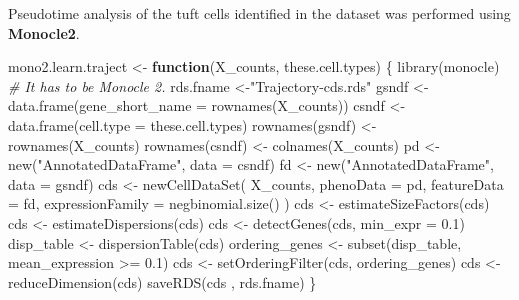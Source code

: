 \documentclass[
  openany]{book}
\newenvironment{Shaded}{\begin{snugshade}}{\end{snugshade}}
\newcommand{\AttributeTok}[1]{\textcolor[rgb]{0.77,0.63,0.00}{#1}}
\newcommand{\CommentTok}[1]{\textcolor[rgb]{0.56,0.35,0.01}{\textit{#1}}}
\newcommand{\ControlFlowTok}[1]{\textcolor[rgb]{0.13,0.29,0.53}{\textbf{#1}}}
\newcommand{\FloatTok}[1]{\textcolor[rgb]{0.00,0.00,0.81}{#1}}
\newcommand{\FunctionTok}[1]{\textcolor[rgb]{0.00,0.00,0.00}{#1}}
\newcommand{\NormalTok}[1]{#1}
\newcommand{\OtherTok}[1]{\textcolor[rgb]{0.56,0.35,0.01}{#1}}
\newcommand{\SpecialCharTok}[1]{\textcolor[rgb]{0.00,0.00,0.00}{#1}}
\newcommand{\StringTok}[1]{\textcolor[rgb]{0.31,0.60,0.02}{#1}}
\begin{document}
Pseudotime analysis of the tuft cells identified in the dataset was performed using \textbf{Monocle2}.

\begin{Shaded}
\begin{Highlighting}[]
\NormalTok{mono2.learn.traject }\OtherTok{\textless{}{-}}
  \ControlFlowTok{function}\NormalTok{(X\_counts,}
\NormalTok{           these.cell.types) \{}
    \FunctionTok{library}\NormalTok{(monocle) }\CommentTok{\# It has to be Monocle 2.}
\NormalTok{    rds.fname }\OtherTok{\textless{}{-}}\StringTok{"Trajectory{-}cds.rds"}
\NormalTok{    gsndf }\OtherTok{\textless{}{-}} \FunctionTok{data.frame}\NormalTok{(}\AttributeTok{gene\_short\_name =} \FunctionTok{rownames}\NormalTok{(X\_counts))}
\NormalTok{    csndf }\OtherTok{\textless{}{-}} \FunctionTok{data.frame}\NormalTok{(}\AttributeTok{cell.type =}\NormalTok{ these.cell.types)}
    \FunctionTok{rownames}\NormalTok{(gsndf) }\OtherTok{\textless{}{-}} \FunctionTok{rownames}\NormalTok{(X\_counts)}
    \FunctionTok{rownames}\NormalTok{(csndf) }\OtherTok{\textless{}{-}} \FunctionTok{colnames}\NormalTok{(X\_counts)}
\NormalTok{    pd }\OtherTok{\textless{}{-}} \FunctionTok{new}\NormalTok{(}\StringTok{"AnnotatedDataFrame"}\NormalTok{, }\AttributeTok{data =}\NormalTok{ csndf)}
\NormalTok{    fd }\OtherTok{\textless{}{-}} \FunctionTok{new}\NormalTok{(}\StringTok{"AnnotatedDataFrame"}\NormalTok{, }\AttributeTok{data =}\NormalTok{ gsndf)}
\NormalTok{    cds }\OtherTok{\textless{}{-}}
      \FunctionTok{newCellDataSet}\NormalTok{(}
\NormalTok{        X\_counts,}
        \AttributeTok{phenoData =}\NormalTok{ pd,}
        \AttributeTok{featureData =}\NormalTok{ fd,}
        \AttributeTok{expressionFamily =} \FunctionTok{negbinomial.size}\NormalTok{()}
\NormalTok{      )}
\NormalTok{    cds }\OtherTok{\textless{}{-}} \FunctionTok{estimateSizeFactors}\NormalTok{(cds)}
\NormalTok{    cds }\OtherTok{\textless{}{-}} \FunctionTok{estimateDispersions}\NormalTok{(cds)}
\NormalTok{    cds }\OtherTok{\textless{}{-}} \FunctionTok{detectGenes}\NormalTok{(cds, }\AttributeTok{min\_expr =} \FloatTok{0.1}\NormalTok{)}
\NormalTok{    disp\_table }\OtherTok{\textless{}{-}} \FunctionTok{dispersionTable}\NormalTok{(cds)}
\NormalTok{    ordering\_genes }\OtherTok{\textless{}{-}} \FunctionTok{subset}\NormalTok{(disp\_table, mean\_expression }\SpecialCharTok{\textgreater{}=} \FloatTok{0.1}\NormalTok{)}
\NormalTok{    cds }\OtherTok{\textless{}{-}} \FunctionTok{setOrderingFilter}\NormalTok{(cds, ordering\_genes)}
\NormalTok{    cds }\OtherTok{\textless{}{-}} \FunctionTok{reduceDimension}\NormalTok{(cds)}
    \FunctionTok{saveRDS}\NormalTok{(cds , rds.fname)}
\NormalTok{\}}
\end{Highlighting}
\end{Shaded}
\end{document}
